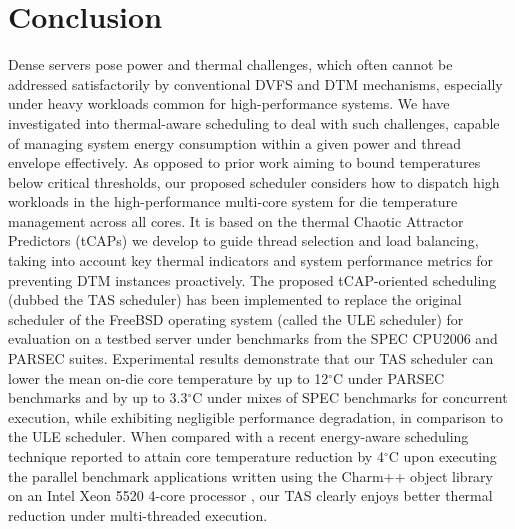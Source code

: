 \documentclass[times, 10pt,twocolumn]{IEEEtran}
\begin{document}
\section{Conclusion}
\label{sec:conclusion}
Dense servers pose power and thermal challenges, which often cannot be
addressed satisfactorily by conventional DVFS and DTM mechanisms,
especially under heavy workloads common for high-performance systems.
We have investigated into thermal-aware scheduling to deal with such
challenges, capable of managing system energy consumption within a given
power and thread envelope effectively.  As opposed to prior work aiming
to bound temperatures below critical thresholds, our proposed scheduler
considers how to dispatch high workloads in the high-performance
multi-core system for die temperature management across all cores.  It
is based on the thermal Chaotic Attractor Predictors (tCAPs) we develop
to guide thread selection and load balancing, taking into account key
thermal indicators and system performance metrics for preventing DTM
instances proactively.  The proposed tCAP-oriented scheduling (dubbed
the TAS scheduler) has been implemented to replace the original
scheduler of the FreeBSD operating system (called the ULE scheduler) for
evaluation on a testbed server under benchmarks from the SPEC CPU2006
and PARSEC suites.  Experimental results demonstrate that our TAS
scheduler can lower the mean on-die core temperature by up to
12$^{\circ}$C under PARSEC benchmarks and by up to 3.3$^{\circ}$C under
mixes of SPEC benchmarks for concurrent execution, while exhibiting
negligible performance degradation, in comparison to the ULE scheduler.
When compared with a recent energy-aware scheduling technique reported
to attain core temperature reduction by 4$^\circ$C upon executing the
parallel benchmark applications written using the Charm++ object library
on an Intel Xeon 5520 4-core processor \cite{Sarood2011}, our TAS
clearly enjoys better thermal reduction under multi-threaded execution.

\label{sec:references}
\begin{small}


\end{small}
\end{document}
